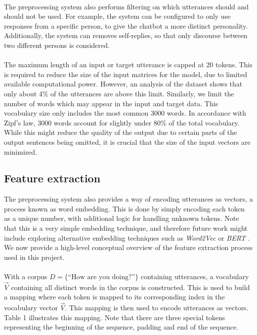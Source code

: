 \documentclass{article}
\begin{document}
\paragraph{}
The preprocessing system also performs filtering on which utterances should
and should not be used. For example, the system can be configured to only
use responses from a specific person, to give the chatbot a more distinct
personality. Additionally, the system can removes self-replies, so that
only discourse between two different persons is considered.

\paragraph{}
The maximum length of an input or target utterance is capped at 20 tokens.
This is required to reduce the size of the input matrices for the model, due
to limited available computational power. However, an analysis of the dataset
shows that only about 4\% of the utterances are above this limit. Similarly,
we limit the number of words which may appear in the input and target data.
This vocabulary size only includes the most common 3000 words. In accordance
with Zipf's law, 3000 words account for slightly under 80\% of the total
vocabulary. While this might reduce the quality of the output due to certain
parts of the output sentences being omitted, it is crucial that the size of
the input vectors are minimized.

\subsection*{Feature extraction}
The preprocessing system also provides a way of encoding utterances as
vectors, a process known as word embedding. This is done by simply
encoding each token as a unique number, with additional logic for handling
unknown tokens. Note that this is a very simple embedding technique, and
therefore future work might include exploring alternative embedding techniques
such as \emph{Word2Vec} \cite{word2vec} or \emph{BERT} \cite{bert2018}.
We now provide a high-level conceptual overview of the feature extraction
process used in this project.

\paragraph{}
With a corpus $D = \{\text{``How are you doing?''}\}$ containing utterances, 
a vocabulary $\vec{V}$ containing all distinct words in the corpus is
constructed. This is used to build a mapping where each token is mapped to
its corresponding index in the vocabulary vector $\vec{V}$. This mapping is
then used to encode utterances as vectors. Table 1 illustrates
this mapping. Note that there are three special tokens representing the
beginning of the sequence, padding and end of the sequence.
\end{document}
